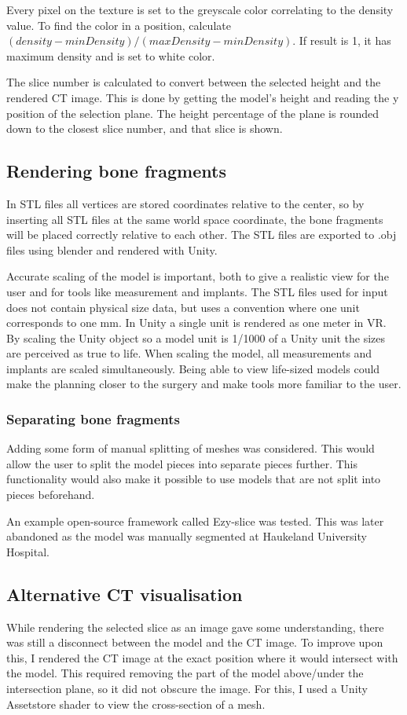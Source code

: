 \documentclass[a4paper]{report}
\begin{document}
Every pixel on the texture is set to the greyscale color correlating to the density value. To find the color in a position, calculate $(density-minDensity)/(maxDensity-minDensity)$.
If result is 1, it has maximum density and is set to white color.


The slice number is calculated to convert between the selected height and the rendered CT image. This is done by getting the model's height and reading the y position of the selection plane. The height percentage of the plane is rounded down to the closest slice number, and that slice is shown.

\subsection{Rendering bone fragments}
In STL files all vertices are stored coordinates relative to the center, so by inserting all STL files at the same world space coordinate, the bone fragments will be placed correctly relative to each other. The STL files are exported to .obj files using blender and rendered with Unity.

Accurate scaling of the model is important, both to give a realistic view for the user and for tools like measurement and implants. The STL files used for input does not contain physical size data, but uses a convention where one unit corresponds to one mm. In Unity a single unit is rendered as one meter in VR. By scaling the Unity object so a model unit is 1/1000 of a Unity unit the sizes are perceived as true to life. When scaling the model, all measurements and implants are scaled simultaneously.
Being able to view life-sized models could make the planning closer to the surgery and make tools more familiar to the user.

\subsubsection{Separating bone fragments}
Adding some form of manual splitting of meshes was considered. This would allow the user to split the model pieces into separate pieces further. This functionality would also make it possible to use models that are not split into pieces beforehand.

An example open-source framework called Ezy-slice\cite{arayan_davidarayanezy-slice_2022} was tested. This was later abandoned as the model was manually segmented at Haukeland University Hospital.

\subsection{Alternative CT visualisation}
While rendering the selected slice as an image gave some understanding, there was still a disconnect between the model and the CT image. To improve upon this, I rendered the CT image at the exact position where it would intersect with the model.
This required removing the part of the model above/under the intersection plane, so it did not obscure the image. For this, I used a Unity Assetstore shader to view the cross-section of a mesh\cite{aldandarawy_unity_2019}.
\end{document}
